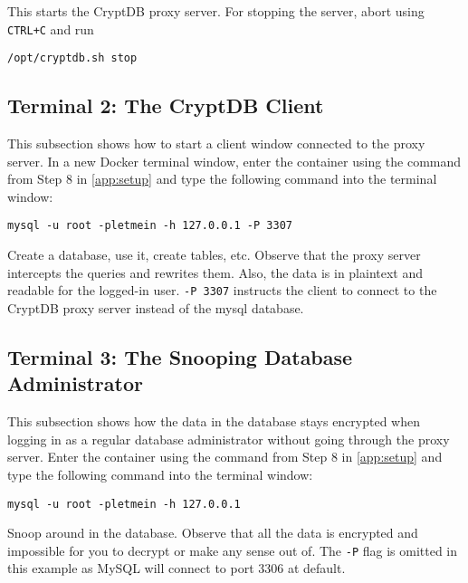 \noindent
This starts the CryptDB proxy server. For stopping the server, abort using \verb!CTRL+C! and run

\verb!/opt/cryptdb.sh stop!


\subsection{Terminal 2: The CryptDB Client}
This subsection shows how to start a client window connected to the proxy server. In a new Docker terminal window, enter the container using the command from Step 8 in \ref{app:setup} and type the following command into the terminal window:

\verb!mysql -u root -pletmein -h 127.0.0.1 -P 3307!

\noindent
Create a database, use it, create tables, etc. Observe that the proxy server intercepts the queries and rewrites them. Also, the data is in plaintext and readable for the logged-in user. \verb!-P 3307! instructs the client to connect to the CryptDB proxy server instead of the mysql database.

\subsection{Terminal 3: The Snooping Database Administrator}
This subsection shows how the data in the database stays encrypted when logging in as a regular database administrator without going through the proxy server. Enter the container using the command from Step 8 in \ref{app:setup} and type the following command into the terminal window:

\verb!mysql -u root -pletmein -h 127.0.0.1!

\noindent
Snoop around in the database. Observe that all the data is encrypted and impossible for you to decrypt or make any sense out of. The \verb!-P! flag is omitted in this example as MySQL will connect to port 3306 at default.